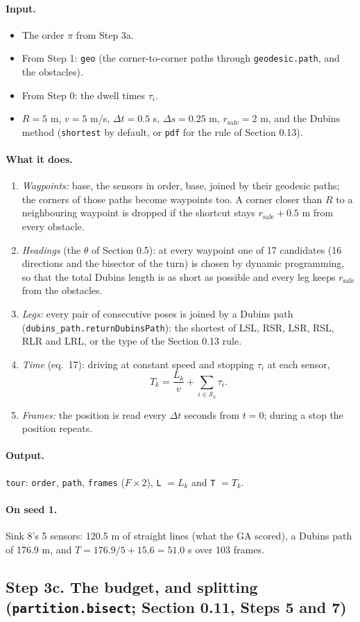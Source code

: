 \documentclass[10pt]{article}
\newcommand{\code}[1]{\texttt{#1}}
\newcommand{\rsafe}{r_{\mathrm{safe}}}
\newcommand{\inputs}{\paragraph{Input.}}
\newcommand{\does}{\paragraph{What it does.}}
\newcommand{\outputs}{\paragraph{Output.}}
\newcommand{\seedone}{\paragraph{On seed 1.}}
\begin{document}
\inputs
\begin{itemize}
  \item The order $\pi$ from Step 3a.
  \item From Step 1: \code{geo} (the corner-to-corner paths through \code{geodesic.path}, and the obstacles).
  \item From Step 0: the dwell times $\tau_i$.
  \item $R = 5$ m, $v = 5$ m/s, $\Delta t = 0.5$ s, $\Delta s = 0.25$ m, $\rsafe = 2$ m, and the Dubins method
    (\code{shortest} by default, or \code{pdf} for the rule of Section 0.13).
\end{itemize}
\does
\begin{enumerate}
  \item \emph{Waypoints:} base, the sensors in order, base, joined by their geodesic paths; the corners of those paths
    become waypoints too. A corner closer than $R$ to a neighbouring waypoint is dropped if the shortcut stays
    $\rsafe + 0.5$ m from every obstacle.
  \item \emph{Headings} (the $\theta$ of Section 0.5): at every waypoint one of 17 candidates (16 directions and the
    bisector of the turn) is chosen by dynamic programming, so that the total Dubins length is as short as possible and
    every leg keeps $\rsafe$ from the obstacles.
  \item \emph{Legs:} every pair of consecutive poses is joined by a Dubins path (\code{dubins\_path.returnDubinsPath}):
    the shortest of LSL, RSR, LSR, RSL, RLR and LRL, or the type of the Section 0.13 rule.
  \item \emph{Time} (eq.~17): driving at constant speed and stopping $\tau_i$ at each sensor,
    \[ T_k = \frac{L_k}{v} + \sum_{i \in \mathcal{S}_k} \tau_i . \]
  \item \emph{Frames:} the position is read every $\Delta t$ seconds from $t = 0$; during a stop the position repeats.
\end{enumerate}
\outputs \code{tour}: \code{order}, \code{path}, \code{frames} ($F\times2$), \code{L} $= L_k$ and \code{T} $= T_k$.
\seedone Sink 8's 5 sensors: 120.5 m of straight lines (what the GA scored), a Dubins path of 176.9 m, and
$T = 176.9 / 5 + 15.6 = 51.0$ s over 103 frames.

\subsection*{Step 3c. The budget, and splitting (\code{partition.bisect}; Section 0.11, Steps 5 and 7)}
\end{document}
